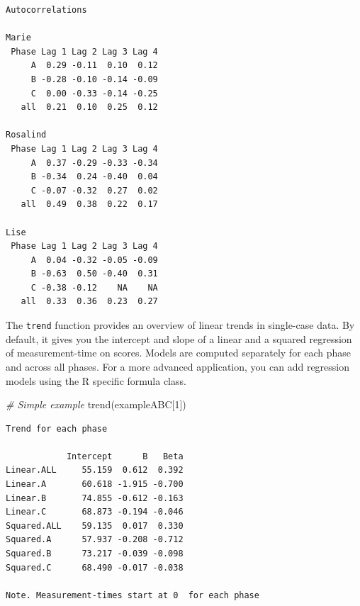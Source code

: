 \documentclass[
]{book}
\newenvironment{Shaded}{\begin{snugshade}}{\end{snugshade}}
\newcommand{\AttributeTok}[1]{\textcolor[rgb]{0.77,0.63,0.00}{#1}}
\newcommand{\CommentTok}[1]{\textcolor[rgb]{0.56,0.35,0.01}{\textit{#1}}}
\newcommand{\DecValTok}[1]{\textcolor[rgb]{0.00,0.00,0.81}{#1}}
\newcommand{\FunctionTok}[1]{\textcolor[rgb]{0.00,0.00,0.00}{#1}}
\newcommand{\NormalTok}[1]{#1}
\newcommand{\OtherTok}[1]{\textcolor[rgb]{0.56,0.35,0.01}{#1}}
\newcommand{\SpecialCharTok}[1]{\textcolor[rgb]{0.00,0.00,0.00}{#1}}
\newcommand{\StringTok}[1]{\textcolor[rgb]{0.31,0.60,0.02}{#1}}
\begin{document}
\begin{verbatim}
Autocorrelations

Marie 
 Phase Lag 1 Lag 2 Lag 3 Lag 4
     A  0.29 -0.11  0.10  0.12
     B -0.28 -0.10 -0.14 -0.09
     C  0.00 -0.33 -0.14 -0.25
   all  0.21  0.10  0.25  0.12

Rosalind 
 Phase Lag 1 Lag 2 Lag 3 Lag 4
     A  0.37 -0.29 -0.33 -0.34
     B -0.34  0.24 -0.40  0.04
     C -0.07 -0.32  0.27  0.02
   all  0.49  0.38  0.22  0.17

Lise 
 Phase Lag 1 Lag 2 Lag 3 Lag 4
     A  0.04 -0.32 -0.05 -0.09
     B -0.63  0.50 -0.40  0.31
     C -0.38 -0.12    NA    NA
   all  0.33  0.36  0.23  0.27
\end{verbatim}

The \texttt{trend} function provides an overview of linear trends in single-case data. By default, it gives you the intercept and slope of a linear and a squared regression of measurement-time on scores. Models are computed separately for each phase and across all phases. For a more advanced application, you can add regression models using the R specific formula class.

\begin{Shaded}
\begin{Highlighting}[]
\CommentTok{\# Simple example}
\FunctionTok{trend}\NormalTok{(exampleABC[}\DecValTok{1}\NormalTok{])}
\end{Highlighting}
\end{Shaded}

\begin{verbatim}
Trend for each phase

            Intercept      B   Beta
Linear.ALL     55.159  0.612  0.392
Linear.A       60.618 -1.915 -0.700
Linear.B       74.855 -0.612 -0.163
Linear.C       68.873 -0.194 -0.046
Squared.ALL    59.135  0.017  0.330
Squared.A      57.937 -0.208 -0.712
Squared.B      73.217 -0.039 -0.098
Squared.C      68.490 -0.017 -0.038

Note. Measurement-times start at 0  for each phase
\end{verbatim}

\begin{Shaded}
\end{Shaded}
\end{document}
